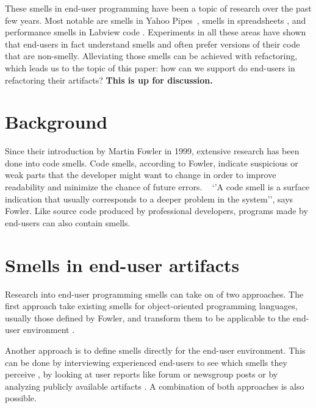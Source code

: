 \documentclass[10pt,conference,compsocconf]{IEEEtran}
\newcommand{\todo}[1]{\textbf{#1}}
\begin{document}
These smells in end-user programming have been a topic of research over the past few years. Most notable are smells in Yahoo Pipes~\cite{Stolee2011}, smells in spreadsheets \cite{Hermans2012inter}, and performance smells in Labview code \cite{chambers2013smell}. Experiments in all these areas have shown that end-users in fact understand smells and often prefer versions of their code that are non-smelly. Alleviating those smells can be achieved with refactoring, which leads us to the topic of this paper: how can we support do end-users in refactoring their artifacts? \todo{This is up for discussion.}

\section{Background}
\label{sec:background}

Since their introduction by Martin Fowler in 1999, extensive research has been done into code smells. Code smells, according to Fowler, indicate suspicious or weak parts that the developer might want to change in order to improve readability and minimize the chance of future errors. ~\cite{Fowl1999} `'A code smell is a surface indication that usually corresponds to a deeper problem in the system'', says Fowler. Like source code produced by professional developers, programs made by end-users can also contain smells.

\section{Smells in end-user artifacts}
\label{sec:smells}
Research into end-user programming smells can take on of two approaches.
The first approach take existing smells for object-oriented programming languages, usually those defined by Fowler, and transform them to be applicable to the end-user environment \cite{Hermans2012intra,Hermans2012inter}.

Another approach is to define smells directly for the end-user environment.
This can be done by interviewing experienced end-users to see which smells they perceive \cite{chambers2013smell}, by looking at user reports like forum or newsgroup posts \cite{Stolee2011} or by analyzing publicly available artifacts \cite{Stolee2011}.
A combination of both approaches is also possible.
\end{document}
